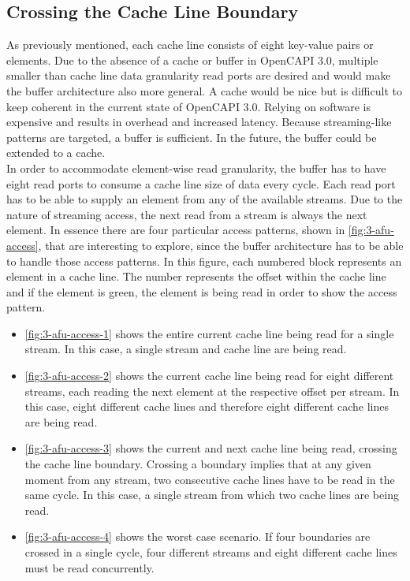 \subsection{Crossing the Cache Line Boundary}
\label{sec:boundary}
As previously mentioned, each cache line consists of eight key-value pairs or elements. Due to the absence of a cache or buffer in OpenCAPI 3.0, multiple smaller than cache line data granularity read ports are desired and would make the buffer architecture also more general. A cache would be nice but is difficult to keep coherent in the current state of OpenCAPI 3.0. Relying on software is expensive and results in overhead and increased latency. Because streaming-like patterns are targeted, a buffer is sufficient. In the future, the buffer could be extended to a cache.\\
In order to accommodate element-wise read granularity, the buffer has to have eight read ports to consume a cache line size of data every cycle. Each read port has to be able to supply an element from any of the available streams. Due to the nature of streaming access, the next read from a stream is always the next element. In essence there are four particular access patterns, shown in \autoref{fig:3-afu-access}, that are interesting to explore, since the buffer architecture has to be able to handle those access patterns. In this figure, each numbered block represents an element in a cache line. The number represents the offset within the cache line and if the element is green, the element is being read in order to show the access pattern.
\begin{itemize}
  \item{\autoref{fig:3-afu-access-1} shows the entire current cache line being read for a single stream. In this case, a single stream and cache line are being read.}
  \item{\autoref{fig:3-afu-access-2} shows the current cache line being read for eight different streams, each reading the next element at the respective offset per stream. In this case, eight different cache lines and therefore eight different cache lines are being read.}
  \item{\autoref{fig:3-afu-access-3} shows the current and next cache line being read, crossing the cache line boundary. Crossing a boundary implies that at any given moment from any stream, two consecutive cache lines have to be read in the same cycle. In this case, a single stream from which two cache lines are being read.}
  \item{\autoref{fig:3-afu-access-4} shows the worst case scenario. If four boundaries are crossed in a single cycle, four different streams and eight different cache lines must be read concurrently.}
\end{itemize}

